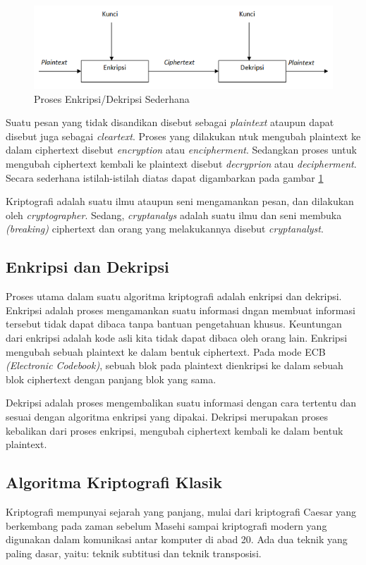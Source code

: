 \documentclass{jtetiproposalskripsi}
\begin{document}
\begin{figure}[ht!]
  \centering
    \includegraphics{gambar/kripto}
    \caption{Proses Enkripsi/Dekripsi Sederhana}
    \label{kripto}
\end{figure}

Suatu pesan yang tidak disandikan disebut sebagai \emph{plaintext} ataupun dapat disebut juga sebagai \emph{cleartext}. Proses yang dilakukan ntuk mengubah plaintext ke dalam ciphertext disebut \emph{encryption} atau \emph{encipherment}. Sedangkan proses untuk mengubah ciphertext kembali ke plaintext disebut \emph{decryprion} atau \emph{decipherment}. Secara sederhana istilah-istilah diatas dapat digambarkan pada gambar \ref{kripto}

Kriptografi adalah suatu ilmu ataupun seni mengamankan pesan, dan dilakukan oleh \emph{cryptographer}. Sedang, \emph{cryptanalys} adalah suatu ilmu dan seni membuka \emph{(breaking)} ciphertext dan orang yang melakukannya disebut \emph{cryptanalyst}.



\subsection{Enkripsi dan Dekripsi}
Proses utama dalam suatu algoritma kriptografi adalah enkripsi dan dekripsi. Enkripsi adalah proses mengamankan suatu informasi dngan membuat informasi tersebut tidak dapat dibaca tanpa bantuan pengetahuan khusus. Keuntungan dari enkripsi adalah kode asli kita tidak dapat dibaca oleh orang lain. Enkripsi mengubah sebuah plaintext ke dalam bentuk ciphertext. Pada mode ECB \emph{(Electronic Codebook)}, sebuah blok pada plaintext dienkripsi ke dalam sebuah blok ciphertext dengan panjang blok yang sama.

Dekripsi adalah proses mengembalikan suatu informasi dengan cara tertentu dan sesuai dengan algoritma enkripsi yang dipakai. Dekripsi merupakan proses kebalikan dari proses enkripsi, mengubah ciphertext kembali ke dalam bentuk plaintext. 


\subsection{Algoritma Kriptografi Klasik}
Kriptografi mempunyai sejarah yang panjang, mulai dari kriptografi Caesar yang berkembang pada zaman sebelum Masehi sampai kriptografi modern yang digunakan dalam komunikasi antar komputer di abad 20. Ada dua teknik yang paling dasar, yaitu: teknik subtitusi dan teknik transposisi.
\end{document}
